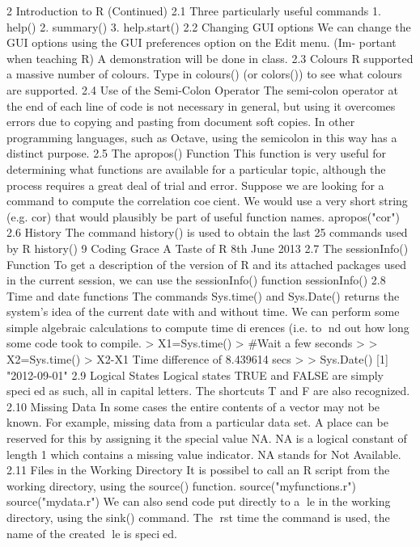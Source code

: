 2 Introduction to R (Continued)
2.1 Three particularly useful commands
1. help()
2. summary()
3. help.start()
2.2 Changing GUI options
We can change the GUI options using the GUI preferences option on the Edit menu. (Im-
portant when teaching R) A demonstration will be done in class.
2.3 Colours
R supported a massive number of colours. Type in colours() (or colors()) to see what colours
are supported.
2.4 Use of the Semi-Colon Operator
The semi-colon operator at the end of each line of code is not necessary in general, but using it
overcomes errors due to copying and pasting from document soft copies. In other programming
languages, such as Octave, using the semicolon in this way has a distinct purpose.
2.5 The apropos() Function
This function is very useful for determining what functions are available for a particular topic,
although the process requires a great deal of trial and error. Suppose we are looking for a
command to compute the correlation coecient. We would use a very short string (e.g. cor)
that would plausibly be part of useful function names.
apropos("cor")
2.6 History
The command history() is used to obtain the last 25 commands used by R
history()
9
Coding Grace A Taste of R 8th June 2013
2.7 The sessionInfo() Function
To get a description of the version of R and its attached packages used in the current session,
we can use the sessionInfo() function
sessionInfo()
2.8 Time and date functions
The commands Sys.time() and Sys.Date() returns the system's idea of the current date
with and without time. We can perform some simple algebraic calculations to compute time
dierences (i.e. to nd out how long some code took to compile.
> X1=Sys.time()
> #Wait a few seconds
>
> X2=Sys.time()
> X2-X1 Time difference of 8.439614 secs
>
> Sys.Date() [1] "2012-09-01"
2.9 Logical States
Logical states TRUE and FALSE are simply specied as such, all in capital letters. The
shortcuts T and F are also recognized.
2.10 Missing Data
In some cases the entire contents of a vector may not be known. For example, missing data
from a particular data set. A place can be reserved for this by assigning it the special value
NA.
NA is a logical constant of length 1 which contains a missing value indicator. NA stands
for Not Available.
2.11 Files in the Working Directory
It is possibel to call an R script from the working directory, using the source() function.
source("myfunctions.r")
source("mydata.r")
We can also send code put directly to a le in the working directory, using the sink()
command. The rst time the command is used, the name of the created le is specied.
